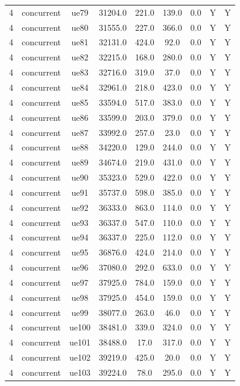 \begin{table}[ht]
\begin{tabular}{|c|c|c|c|c|c|c|c|c|}
4 & concurrent & ue79 & 31204.0 & 221.0 & 139.0 & 0.0 & Y & Y \\
4 & concurrent & ue80 & 31555.0 & 227.0 & 366.0 & 0.0 & Y & Y \\
4 & concurrent & ue81 & 32131.0 & 424.0 & 92.0 & 0.0 & Y & Y \\
4 & concurrent & ue82 & 32215.0 & 168.0 & 280.0 & 0.0 & Y & Y \\
4 & concurrent & ue83 & 32716.0 & 319.0 & 37.0 & 0.0 & Y & Y \\
4 & concurrent & ue84 & 32961.0 & 218.0 & 423.0 & 0.0 & Y & Y \\
4 & concurrent & ue85 & 33594.0 & 517.0 & 383.0 & 0.0 & Y & Y \\
4 & concurrent & ue86 & 33599.0 & 203.0 & 379.0 & 0.0 & Y & Y \\
4 & concurrent & ue87 & 33992.0 & 257.0 & 23.0 & 0.0 & Y & Y \\
4 & concurrent & ue88 & 34220.0 & 129.0 & 244.0 & 0.0 & Y & Y \\
4 & concurrent & ue89 & 34674.0 & 219.0 & 431.0 & 0.0 & Y & Y \\
4 & concurrent & ue90 & 35323.0 & 529.0 & 422.0 & 0.0 & Y & Y \\
4 & concurrent & ue91 & 35737.0 & 598.0 & 385.0 & 0.0 & Y & Y \\
4 & concurrent & ue92 & 36333.0 & 863.0 & 114.0 & 0.0 & Y & Y \\
4 & concurrent & ue93 & 36337.0 & 547.0 & 110.0 & 0.0 & Y & Y \\
4 & concurrent & ue94 & 36337.0 & 225.0 & 112.0 & 0.0 & Y & Y \\
4 & concurrent & ue95 & 36876.0 & 424.0 & 214.0 & 0.0 & Y & Y \\
4 & concurrent & ue96 & 37080.0 & 292.0 & 633.0 & 0.0 & Y & Y \\
4 & concurrent & ue97 & 37925.0 & 784.0 & 159.0 & 0.0 & Y & Y \\
4 & concurrent & ue98 & 37925.0 & 454.0 & 159.0 & 0.0 & Y & Y \\
4 & concurrent & ue99 & 38077.0 & 263.0 & 46.0 & 0.0 & Y & Y \\
4 & concurrent & ue100 & 38481.0 & 339.0 & 324.0 & 0.0 & Y & Y \\
4 & concurrent & ue101 & 38488.0 & 17.0 & 317.0 & 0.0 & Y & Y \\
4 & concurrent & ue102 & 39219.0 & 425.0 & 20.0 & 0.0 & Y & Y \\
4 & concurrent & ue103 & 39224.0 & 78.0 & 295.0 & 0.0 & Y & Y \\

\end{tabular}
\end{table}
